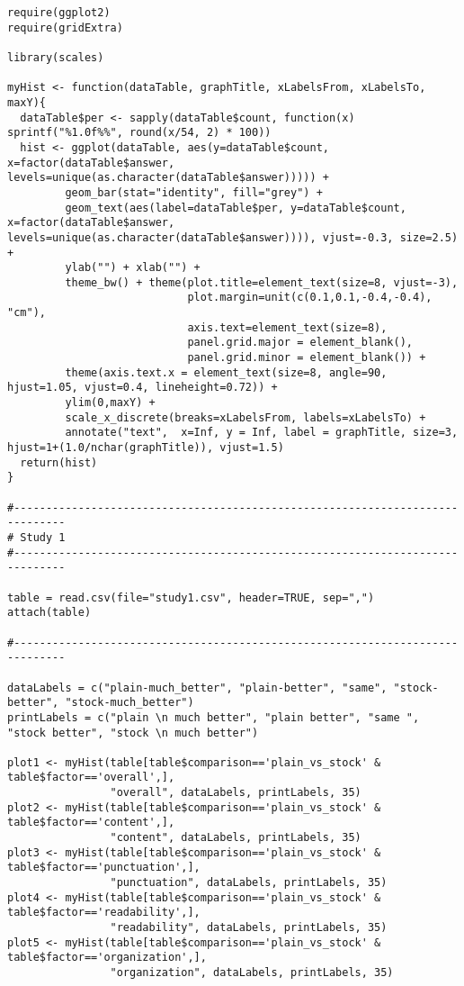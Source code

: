 \documentclass{article}
\begin{document}
\begin{verbatim}
require(ggplot2)
require(gridExtra)

library(scales)

myHist <- function(dataTable, graphTitle, xLabelsFrom, xLabelsTo, maxY){
  dataTable$per <- sapply(dataTable$count, function(x) sprintf("%1.0f%%", round(x/54, 2) * 100))
  hist <- ggplot(dataTable, aes(y=dataTable$count, x=factor(dataTable$answer, levels=unique(as.character(dataTable$answer))))) +
         geom_bar(stat="identity", fill="grey") +
         geom_text(aes(label=dataTable$per, y=dataTable$count, x=factor(dataTable$answer, levels=unique(as.character(dataTable$answer)))), vjust=-0.3, size=2.5) +
         ylab("") + xlab("") +
         theme_bw() + theme(plot.title=element_text(size=8, vjust=-3),
                            plot.margin=unit(c(0.1,0.1,-0.4,-0.4), "cm"),
                            axis.text=element_text(size=8),
                            panel.grid.major = element_blank(),
                            panel.grid.minor = element_blank()) +
         theme(axis.text.x = element_text(size=8, angle=90, hjust=1.05, vjust=0.4, lineheight=0.72)) +
         ylim(0,maxY) +
         scale_x_discrete(breaks=xLabelsFrom, labels=xLabelsTo) +
         annotate("text",  x=Inf, y = Inf, label = graphTitle, size=3, hjust=1+(1.0/nchar(graphTitle)), vjust=1.5)
  return(hist)
}

#------------------------------------------------------------------------------
# Study 1
#------------------------------------------------------------------------------

table = read.csv(file="study1.csv", header=TRUE, sep=",")
attach(table)

#------------------------------------------------------------------------------

dataLabels = c("plain-much_better", "plain-better", "same", "stock-better", "stock-much_better")
printLabels = c("plain \n much better", "plain better", "same ", "stock better", "stock \n much better")

plot1 <- myHist(table[table$comparison=='plain_vs_stock' & table$factor=='overall',],
                "overall", dataLabels, printLabels, 35)
plot2 <- myHist(table[table$comparison=='plain_vs_stock' & table$factor=='content',],
                "content", dataLabels, printLabels, 35)
plot3 <- myHist(table[table$comparison=='plain_vs_stock' & table$factor=='punctuation',],
                "punctuation", dataLabels, printLabels, 35)
plot4 <- myHist(table[table$comparison=='plain_vs_stock' & table$factor=='readability',],
                "readability", dataLabels, printLabels, 35)
plot5 <- myHist(table[table$comparison=='plain_vs_stock' & table$factor=='organization',],
                "organization", dataLabels, printLabels, 35)


\end{verbatim}
\end{document}
